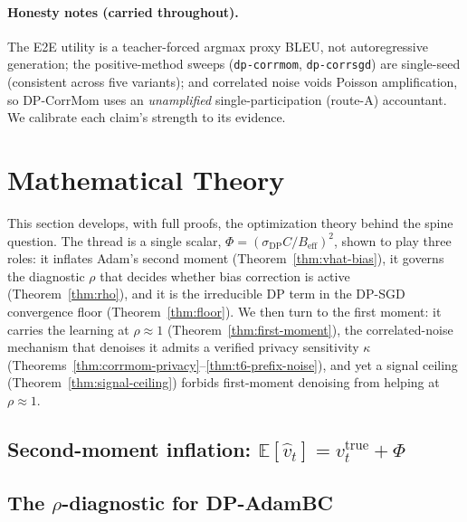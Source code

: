 \documentclass[11pt]{article}
\newcommand{\E}{\mathbb{E}}
\theoremstyle{plain}
\theoremstyle{definition}
\theoremstyle{remark}
\begin{document}
\paragraph{Honesty notes (carried throughout).}
The E2E utility is a teacher-forced argmax proxy BLEU, not autoregressive generation; the
positive-method sweeps (\texttt{dp-corrmom}, \texttt{dp-corrsgd}) are single-seed (consistent across
five variants); and correlated noise voids Poisson amplification, so DP-CorrMom uses an
\emph{unamplified} single-participation (route-A) accountant. We calibrate each claim's strength to
its evidence.

\section{Mathematical Theory}
\label{sec:theory}

This section develops, with full proofs, the optimization theory behind the spine question. The
thread is a single scalar, $\Phi=(\sigma_{\mathrm{DP}}C/B_{\mathrm{eff}})^2$, shown to play three
roles: it inflates Adam's second moment (Theorem~\ref{thm:vhat-bias}), it governs the diagnostic
$\rho$ that decides whether bias correction is active (Theorem~\ref{thm:rho}), and it is the
irreducible DP term in the DP-SGD convergence floor (Theorem~\ref{thm:floor}). We then turn to the
first moment: it carries the learning at $\rho\!\approx\!1$ (Theorem~\ref{thm:first-moment}), the
correlated-noise mechanism that denoises it admits a verified privacy sensitivity $\kappa$
(Theorems~\ref{thm:corrmom-privacy}--\ref{thm:t6-prefix-noise}), and yet a signal ceiling
(Theorem~\ref{thm:signal-ceiling}) forbids first-moment denoising from helping at $\rho\!\approx\!1$.

\subsection{Second-moment inflation: \texorpdfstring{$\E[\hat v_t]=v^{\mathrm{true}}_t+\Phi$}{E[vhat]=vtrue+Phi}}
\label{sec:theory-inflation}



\subsection{The \texorpdfstring{$\rho$}{rho}-diagnostic for DP-AdamBC}
\label{sec:theory-rho}
\end{document}
